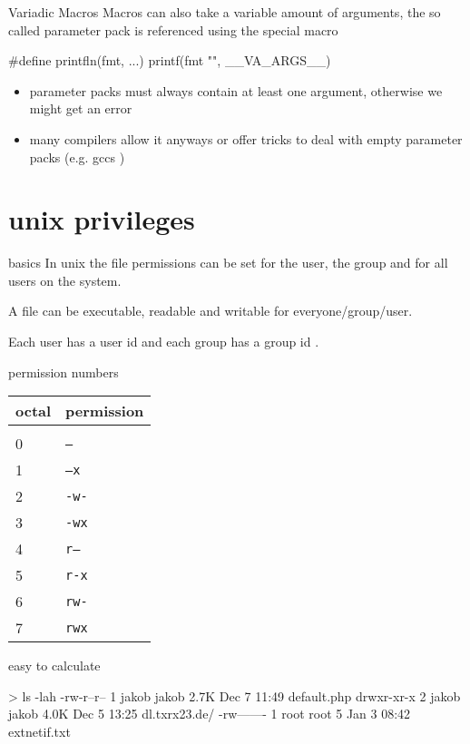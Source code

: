 \documentclass[10pt,graphics,aspectratio=169,table]{beamer}
\begin{document}
\begin{frame}[fragile]{Variadic Macros}
    Macros can also take a variable amount of arguments, the so called
    parameter pack is referenced using the special macro 

    \begin{codeblock}
#define printfln(fmt, ...) printf(fmt "\n", __VA_ARGS__)
    \end{codeblock}
    \begin{itemize}
        \item parameter packs must always contain at least one argument,
        otherwise we might get an error
        \item many compilers allow it anyways or offer tricks to deal with 
            empty parameter packs (e.g. gccs )
    \end{itemize}
\end{frame}

\section{unix privileges}
\begin{frame}[fragile]{basics}
In unix the file permissions can be set for the user, the group and for all users on the system.

A file can be executable, readable and writable for everyone/group/user.

Each user has a user id  and each group has a group id .

\end{frame}

\begin{frame}[fragile]{permission numbers}

\begin{tabular}{l|l}
octal & permission\\
\hline \\
0 & \texttt{---} \\
1 &	\texttt{--x} \\
2 &	\texttt{-w-} \\
3 &	\texttt{-wx} \\
4 &	\texttt{r--} \\
5 &	\texttt{r-x} \\
6 &	\texttt{rw-} \\
7 &	\texttt{rwx} \\
\end{tabular}
easy to calculate 

\begin{codeblock}
> ls -lah
-rw-r--r--  1 jakob jakob 2.7K Dec  7 11:49 default.php
drwxr-xr-x  2 jakob jakob 4.0K Dec  5 13:25 dl.txrx23.de/
-rw-------  1 root  root     5 Jan  3 08:42 extnetif.txt
\end{codeblock}

\end{frame}
\end{document}
